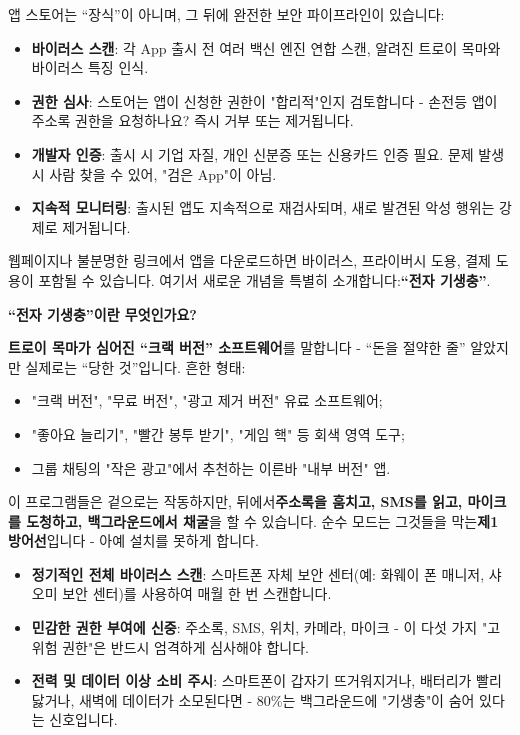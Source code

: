 
앱 스토어는 “장식”이 아니며, 그 뒤에 완전한 보안 파이프라인이 있습니다:

\begin{itemize}
  \item \textbf{바이러스 스캔}: 각 App 출시 전 여러 백신 엔진 연합 스캔, 알려진 트로이 목마와 바이러스 특징 인식.
  \item \textbf{권한 심사}: 스토어는 앱이 신청한 권한이 "합리적"인지 검토합니다 - 손전등 앱이 주소록 권한을 요청하나요? 즉시 거부 또는 제거됩니다.
  \item \textbf{개발자 인증}: 출시 시 기업 자질, 개인 신분증 또는 신용카드 인증 필요. 문제 발생 시 사람 찾을 수 있어, "검은 App"이 아님.
  \item \textbf{지속적 모니터링}: 출시된 앱도 지속적으로 재검사되며, 새로 발견된 악성 행위는 강제로 제거됩니다.
\end{itemize}


웹페이지나 불분명한 링크에서 앱을 다운로드하면 바이러스, 프라이버시 도용, 결제 도용이 포함될 수 있습니다. 여기서 새로운 개념을 특별히 소개합니다:\textbf{“전자 기생충”}.

\textbf{“전자 기생충”이란 무엇인가요?}\par

\textbf{트로이 목마가 심어진 “크랙 버전” 소프트웨어}를 말합니다 - “돈을 절약한 줄” 알았지만 실제로는 “당한 것”입니다. 흔한 형태:

\begin{itemize}
  \item "크랙 버전", "무료 버전", "광고 제거 버전" 유료 소프트웨어;
  \item "좋아요 늘리기", "빨간 봉투 받기", "게임 핵" 등 회색 영역 도구;
  \item 그룹 채팅의 "작은 광고"에서 추천하는 이른바 "내부 버전" 앱.
\end{itemize}

이 프로그램들은 겉으로는 작동하지만, 뒤에서\textbf{주소록을 훔치고, SMS를 읽고, 마이크를 도청하고, 백그라운드에서 채굴}을 할 수 있습니다. 순수 모드는 그것들을 막는\textbf{제1 방어선}입니다 - 아예 설치를 못하게 합니다.


\begin{itemize}
  \item \textbf{정기적인 전체 바이러스 스캔}: 스마트폰 자체 보안 센터(예: 화웨이 폰 매니저, 샤오미 보안 센터)를 사용하여 매월 한 번 스캔합니다.
  \item \textbf{민감한 권한 부여에 신중}: 주소록, SMS, 위치, 카메라, 마이크 - 이 다섯 가지 "고위험 권한"은 반드시 엄격하게 심사해야 합니다.
  \item \textbf{전력 및 데이터 이상 소비 주시}: 스마트폰이 갑자기 뜨거워지거나, 배터리가 빨리 닳거나, 새벽에 데이터가 소모된다면 - 80\%는 백그라운드에 "기생충"이 숨어 있다는 신호입니다.
\end{itemize}


